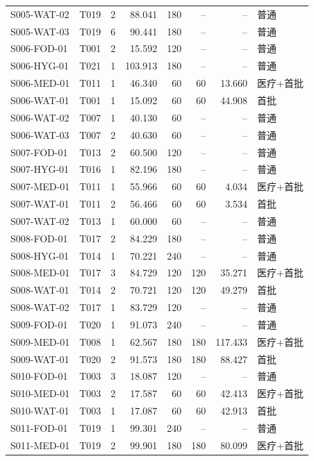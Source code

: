 \begin{longtable}{@{}llrrrrrl@{}}
S005-WAT-02 & T019 & 2 & 88.041 & 180 & -- & -- & 普通 \\
S005-WAT-03 & T019 & 6 & 90.441 & 180 & -- & -- & 普通 \\
S006-FOD-01 & T001 & 2 & 15.592 & 120 & -- & -- & 普通 \\
S006-HYG-01 & T021 & 1 & 103.913 & 180 & -- & -- & 普通 \\
S006-MED-01 & T011 & 1 & 46.340 & 60 & 60 & 13.660 & 医疗+首批 \\
S006-WAT-01 & T001 & 1 & 15.092 & 60 & 60 & 44.908 & 首批 \\
S006-WAT-02 & T007 & 1 & 40.130 & 60 & -- & -- & 普通 \\
S006-WAT-03 & T007 & 2 & 40.630 & 60 & -- & -- & 普通 \\
S007-FOD-01 & T013 & 2 & 60.500 & 120 & -- & -- & 普通 \\
S007-HYG-01 & T016 & 1 & 82.196 & 180 & -- & -- & 普通 \\
S007-MED-01 & T011 & 1 & 55.966 & 60 & 60 & 4.034 & 医疗+首批 \\
S007-WAT-01 & T011 & 2 & 56.466 & 60 & 60 & 3.534 & 首批 \\
S007-WAT-02 & T013 & 1 & 60.000 & 60 & -- & -- & 普通 \\
S008-FOD-01 & T017 & 2 & 84.229 & 180 & -- & -- & 普通 \\
S008-HYG-01 & T014 & 1 & 70.221 & 240 & -- & -- & 普通 \\
S008-MED-01 & T017 & 3 & 84.729 & 120 & 120 & 35.271 & 医疗+首批 \\
S008-WAT-01 & T014 & 2 & 70.721 & 120 & 120 & 49.279 & 首批 \\
S008-WAT-02 & T017 & 1 & 83.729 & 120 & -- & -- & 普通 \\
S009-FOD-01 & T020 & 1 & 91.073 & 240 & -- & -- & 普通 \\
S009-MED-01 & T008 & 1 & 62.567 & 180 & 180 & 117.433 & 医疗+首批 \\
S009-WAT-01 & T020 & 2 & 91.573 & 180 & 180 & 88.427 & 首批 \\
S010-FOD-01 & T003 & 3 & 18.087 & 120 & -- & -- & 普通 \\
S010-MED-01 & T003 & 2 & 17.587 & 60 & 60 & 42.413 & 医疗+首批 \\
S010-WAT-01 & T003 & 1 & 17.087 & 60 & 60 & 42.913 & 首批 \\
S011-FOD-01 & T019 & 1 & 99.301 & 240 & -- & -- & 普通 \\
S011-MED-01 & T019 & 2 & 99.901 & 180 & 180 & 80.099 & 医疗+首批 \\

\end{longtable}
